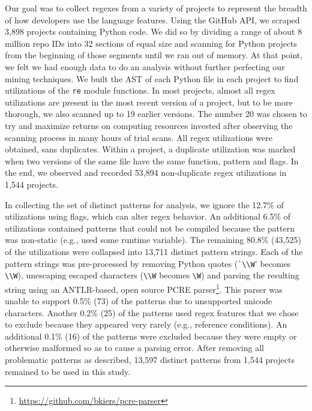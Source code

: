 Our goal was to collect regexes from a variety of projects to represent the breadth of how developers use the language features.
Using the GitHub API, we scraped 3,898 projects containing Python code.
We did so  by dividing a range of about 8 million repo IDs
into 32 sections of equal size and scanning  for Python projects from the beginning of those
segments until we ran out of memory. At that point, we felt we had enough data
to do an analysis without further perfecting our mining techniques. We built
the AST of each Python file in each project to find utilizations of the {\tt re} module
functions. In most projects, almost all regex utilizations are present in the
most recent version of a project, but to be more thorough, we also scanned up
to 19 earlier versions. The number 20 was chosen to try and maximize returns on
computing resources invested after observing the scanning process in many hours
of trial scans.
All regex utilizations were obtained, sans duplicates. Within a project, a duplicate utilization was marked when two versions of the same file have the same function, pattern and flags.  In the end, we observed and recorded 53,894 non-duplicate regex utilizations in 1,544 projects. 

In collecting the set of distinct patterns for analysis,  we ignore the 12.7\%  of utilizations using flags, which can alter regex behavior.  An additional 6.5\% of utilizations contained patterns that could not be compiled because the pattern was non-static (e.g., used some runtime variable).
The remaining 80.8\% (43,525) of the utilizations were collapsed into 13,711 distinct pattern strings.  Each of the pattern strings was pre-processed by removing Python quotes (\verb!`\\W!' becomes \verb!\\W!), unescaping escaped characters (\verb!\\W! becomes \verb!\W!) and parsing the resulting  string using an ANTLR-based, open source PCRE parser\footnote{\url{https://github.com/bkiers/pcre-parser}}.
This parser was unable to support 0.5\% (73) of the patterns due to unsupported unicode characters.  Another 0.2\% (25) of the patterns used regex features that we  chose to exclude because they appeared very rarely (e.g., reference conditions).  An additional 0.1\% (16) of the patterns were excluded because they were empty or otherwise malformed so as to cause a parsing error.  After removing all problematic patterns as described, 13,597 distinct patterns from 1,544 projects remained to be used in this study.



